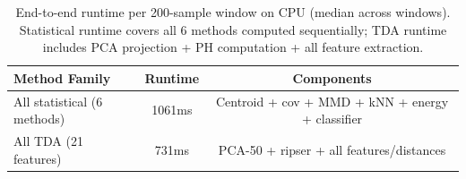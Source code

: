 \begin{table}[t]
    \centering
    \caption{End-to-end runtime per 200-sample window on CPU (median across windows). Statistical runtime covers all 6 methods computed sequentially; TDA runtime includes PCA projection + PH computation + all feature extraction.}
    \begin{tabular}{@{}lcc@{}}
        \toprule
        \textbf{Method Family} & \textbf{Runtime} & \textbf{Components} \\
        \midrule
        All statistical (6 methods) & 1061ms & Centroid + cov + MMD + kNN + energy + classifier \\
        \midrule
        All TDA (21 features) & 731ms & PCA-50 + ripser + all features/distances \\
        \bottomrule
    \end{tabular}
    \label{tab:runtime}
\end{table}
